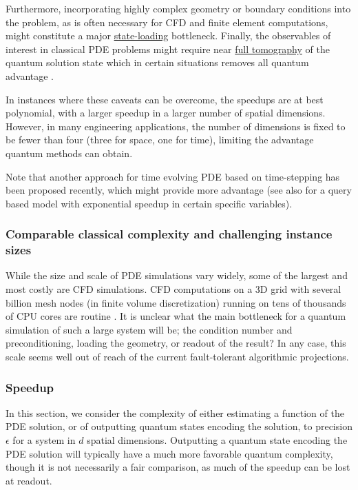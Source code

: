 \begin{refsection}
Furthermore, incorporating highly complex geometry or boundary conditions into the problem, as is often necessary for CFD and finite element computations, might constitute a major \hyperref[prim:LoadingClassicalData]{state-loading} bottleneck.
Finally, the observables of interest in classical PDE problems might require near \hyperref[prim:Tomography]{full tomography} of the quantum solution state which in certain situations removes all quantum advantage \cite{linden2022quantum}. 

In instances where these caveats can be overcome, the speedups are at best polynomial, with a larger speedup in a larger number of spatial dimensions. However, in many engineering applications, the number of dimensions is fixed to be fewer than four (three for space, one for time), limiting the advantage quantum methods can obtain. 

Note that another approach for time evolving PDE based on time-stepping has been proposed recently, which might provide more advantage \cite{fang2022time} (see also \cite{babbush2023exponential} for a query based model with exponential speedup in certain specific variables). 


\subsubsection{Comparable classical complexity and challenging instance sizes}

While the size and scale of PDE simulations vary widely, some of the largest and most costly are CFD simulations. CFD computations on a 3D grid with several billion mesh nodes (in finite volume discretization) running on tens of thousands of CPU cores are routine \cite{lapworth2022hybrid}. It is unclear what the main bottleneck for a quantum simulation of such a large system will be; the condition number and preconditioning, loading the geometry, or readout of the result? In any case, this scale seems well out of reach of the current fault-tolerant algorithmic projections. 



\subsubsection*{Speedup}

In this section, we consider the complexity of either estimating a function of the PDE solution, or of outputting quantum states encoding the solution, to precision $\epsilon$ for a system in $d$ spatial dimensions.  Outputting a quantum state encoding the PDE solution will typically have a much more favorable quantum complexity, though it is not necessarily a fair comparison, as much of the speedup can be lost at readout.  


\end{refsection}
